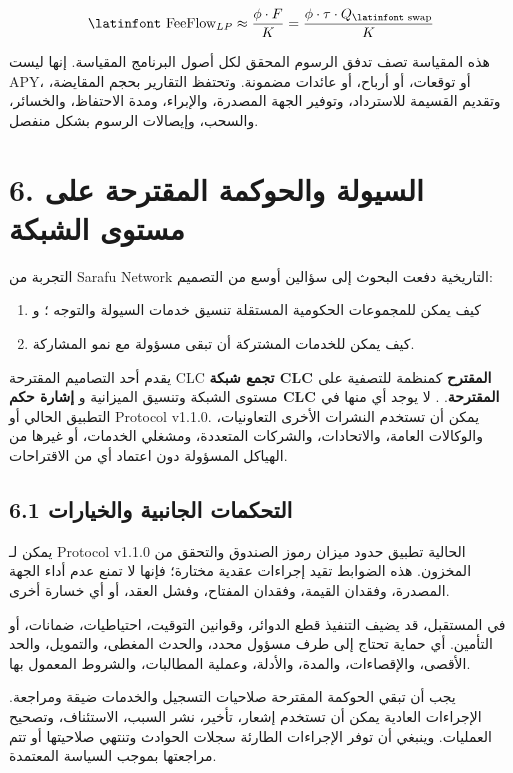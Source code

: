 \documentclass[11pt]{article}
\begin{document}
\[
\text{\latinfont FeeFlow}_{LP} \approx \frac{\phi \cdot F}{K} = \frac{\phi \cdot \tau \cdot Q_{\text{\latinfont swap}}}{K}
\]

هذه المقياسة تصف تدفق الرسوم المحقق لكل أصول البرنامج المقياسة. إنها ليست APY، أو توقعات، أو أرباح، أو عائدات مضمونة. وتحتفظ التقارير بحجم المقايضة، وتقديم القسيمة للاسترداد، وتوفير الجهة المصدرة، والإبراء، ومدة الاحتفاظ، والخسائر، والسحب، وإيصالات الرسوم بشكل منفصل.


\section*{6. السيولة والحوكمة المقترحة على مستوى الشبكة}

التجربة من Sarafu Network التاريخية دفعت البحوث إلى سؤالين أوسع من التصميم:

\begin{enumerate}[leftmargin=*]
\item كيف يمكن للمجموعات الحكومية المستقلة تنسيق خدمات السيولة والتوجه ؛ و
\item كيف يمكن للخدمات المشتركة أن تبقى مسؤولة مع نمو المشاركة.
\end{enumerate}
يقدم أحد التصاميم المقترحة CLC \textbf{تجمع شبكة CLC المقترح} كمنظمة للتصفية على مستوى الشبكة وتنسيق الميزانية و \textbf{إشارة حكم CLC المقترحة}. . لا يوجد أي منها في التطبيق الحالي أو Protocol v1.1.0. يمكن أن تستخدم النشرات الأخرى التعاونيات، والوكالات العامة، والاتحادات، والشركات المتعددة، ومشغلي الخدمات، أو غيرها من الهياكل المسؤولة دون اعتماد أي من الاقتراحات.

\subsection*{6.1 التحكمات الجانبية والخيارات}

يمكن لـ Protocol v1.1.0 الحالية تطبيق حدود ميزان رموز الصندوق والتحقق من المخزون. هذه الضوابط تقيد إجراءات عقدية مختارة؛ فإنها لا تمنع عدم أداء الجهة المصدرة، وفقدان القيمة، وفقدان المفتاح، وفشل العقد، أو أي خسارة أخرى.

في المستقبل، قد يضيف التنفيذ قطع الدوائر، وقوانين التوقيت، احتياطيات، ضمانات، أو التأمين. أي حماية تحتاج إلى طرف مسؤول محدد، والحدث المغطى، والتمويل، والحد الأقصى، والإقصاءات، والمدة، والأدلة، وعملية المطالبات، والشروط المعمول بها.

يجب أن تبقي الحوكمة المقترحة صلاحيات التسجيل والخدمات ضيقة ومراجعة. الإجراءات العادية يمكن أن تستخدم إشعار، تأخير، نشر السبب، الاستئناف، وتصحيح العمليات. وينبغي أن توفر الإجراءات الطارئة سجلات الحوادث وتنتهي صلاحيتها أو تتم مراجعتها بموجب السياسة المعتمدة.
\end{document}
